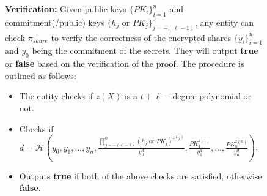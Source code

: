 \begin{figure}[H]
{\begin{tcolorbox}[title=\textbf{$\Lambda_{RO}^{packed}$}, width=1.2\textwidth, colframe=blue!75!black, colback=blue!10, sharp corners]
        \vspace{0.5em}
        \textbf{Verification:}
            Given public keys $\{PK_i\}_{i=1}^n$ and commitment(/public) keys $\{h_j\text{ or }PK_j\}_{j=-(\ell-1)}^0$, any entity can check 
            $\pi_{share}$ to verify the correctness of the encrypted shares $\{y_i\}_{i=1}^n$ and $y_0$ being the commitment of the secrets. 
            They will output \textbf{true} or \textbf{false} based on the verification of the proof. The 
            procedure is outlined as follows:
        \begin{itemize}
            \item The entity checks if $z(X)$ is a $t+\ell-$degree polynomial or not.
            \item Checks if $d=\mathcal{H}(y_0,y_1,\dots,y_n,\frac{\prod_{j=-(\ell-1)}^{0}(h_j\text{ or }PK_j)^{z(j)}}{y_0^d},\frac{PK_1^{z(1)}}{y_1^d},\dots,\frac{PK_n^{z(n)}}{y_n^d})$.
            \item Outputs \textbf{true} if both of the above checks are satisfied, otherwise \textbf{false}.
        \end{itemize}


\end{tcolorbox}}
\end{figure}
